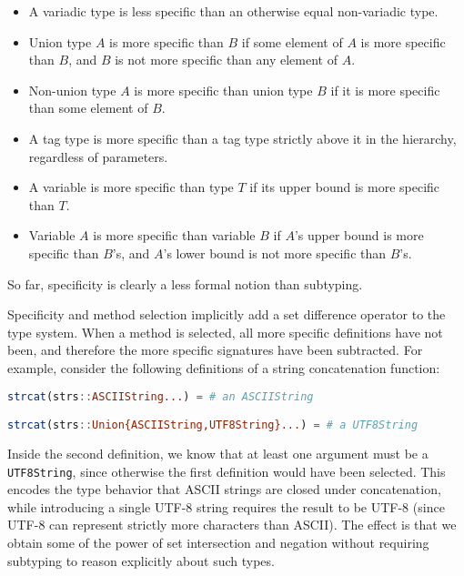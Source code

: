 \begin{itemize}
\item A variadic type is less specific than an otherwise equal non-variadic type.
\item Union type $A$ is more specific than $B$ if some element of $A$ is
more specific than $B$, and $B$ is not more specific than any
element of $A$.
\item Non-union type $A$ is more specific than union type $B$ if it is more specific
than some element of $B$.
\item A tag type is more specific than a tag type strictly above it in the
hierarchy, regardless of parameters.
\item A variable is more specific than type $T$ if its upper bound is more specific
than $T$.
\item Variable $A$ is more specific than variable $B$ if $A$'s upper bound is
more specific than $B$'s, and $A$'s lower bound is not more specific than $B$'s.
\end{itemize}

So far, specificity is clearly a less formal notion than subtyping.

Specificity and method selection implicitly add a set difference operator to
the type system.
When a method is selected, all more specific definitions have not been, and
therefore the more specific signatures have been subtracted.
For example, consider the following definitions of a string concatenation
function:

\begin{singlespace}
\begin{lstlisting}[language=julia]
strcat(strs::ASCIIString...) = # an ASCIIString

strcat(strs::Union{ASCIIString,UTF8String}...) = # a UTF8String
\end{lstlisting}
\end{singlespace}

Inside the second definition, we know that at least one argument must be a
\texttt{UTF8String}, since otherwise the first definition would have
been selected.
This encodes the type behavior that ASCII strings are closed under
concatenation, while introducing a single UTF-8 string requires the result
to be UTF-8 (since UTF-8 can represent strictly more characters than ASCII).
The effect is that we obtain some of the power of set intersection and
negation without requiring subtyping to reason explicitly about such types.


